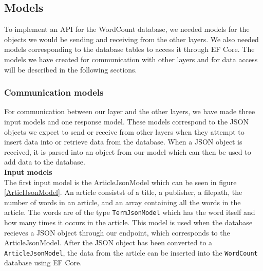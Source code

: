 \subsection{Models}
To implement an API for the WordCount database, we needed models for the objects we would be sending and receiving from the other layers. 
We also needed models corresponding to the database tables to access it through EF Core. The models we have created for communication with other layers and for data access will be described in the following sections.

\subsubsection*{Communication models}
For communication between our layer and the other layers, we have made three input models and one response model. 
These models correspond to the JSON objects we expect to send or receive from other layers when they attempt to insert data into or retrieve data from the database. 
When a JSON object is received, it is parsed into an object from our model which can then be used to add data to the database.
\\

\textbf{Input models}\\
The first input model is the ArticleJsonModel which can be seen in figure \ref{ArticlJsonModel}. An article consistst of a title, a publisher, a filepath, the number of words in an article, and an array containing all the words in the article. 
The words are of the type \texttt{TermJsonModel} which has the word itself and how many times it occurs in the article.
This model is used when the database recieves a JSON object through our endpoint, which corresponds to the ArticleJsonModel. 
After the JSON object has been converted to a \texttt{ArticleJsonModel}, the data from the article can be inserted into the \texttt{WordCount} database using EF Core.


